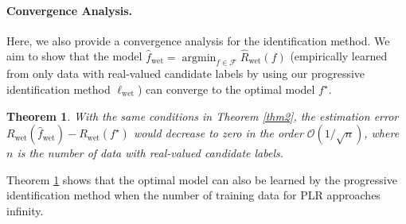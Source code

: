 \documentclass[letterpaper]{article} %
\newtheorem{thm}{Theorem}
\newcommand{\argmin}{\mathop{\arg\min}}
\begin{document}
\paragraph{Convergence Analysis.} Here, we also provide a convergence analysis for the identification method. We aim to show that the model $\widehat{f}_{\mathrm{wet}}=\argmin_{f\in\mathcal{F}}\widehat{R}_{\mathrm{wet}}(f)$ (empirically learned from only data with real-valued candidate labels by using our progressive identification method $\ell_{\mathrm{wet}}$) can converge to the optimal model $f^\star$.
\begin{thm}
\label{thm4}
With the same conditions in Theorem \ref{thm2}, the estimation error $R_{\mathrm{wet}}(\widehat{f}_{\mathrm{wet}})-R_{\mathrm{wet}}(f^\star)$ would decrease to zero in the order $\mathcal{O}({1}/{\sqrt{n}})$, where $n$ is the number of data with real-valued candidate labels.
\end{thm}
Theorem \ref{thm4} shows that the optimal model can also be learned by the progressive identification method when the number of training data for PLR approaches infinity. 
\end{document}
